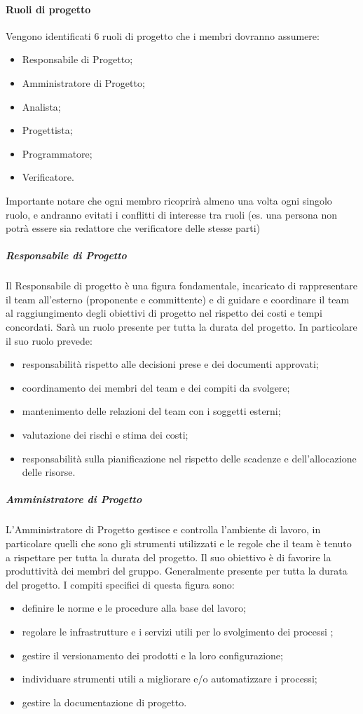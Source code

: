 \paragraph{Ruoli di progetto}
Vengono identificati 6 ruoli di progetto che i membri dovranno assumere:

\begin{itemize}
\item Responsabile di Progetto;
\item Amministratore di Progetto;
\item Analista;
\item Progettista;
\item Programmatore;
\item Verificatore.
\end{itemize}

Importante notare che ogni membro ricoprirà almeno una volta ogni singolo ruolo, e andranno evitati i conflitti di interesse tra ruoli (es. una persona non potrà essere sia redattore che verificatore delle stesse parti)

\subparagraph{Responsabile di Progetto}
Il Responsabile di progetto è una figura fondamentale, incaricato di rappresentare il team all'esterno (proponente e committente)  e di guidare e coordinare il team al raggiungimento degli obiettivi di progetto nel rispetto dei costi e tempi concordati. Sarà un ruolo presente per tutta la durata del progetto.
In particolare il suo ruolo prevede:
\begin{itemize}
\item responsabilità rispetto alle decisioni prese e dei documenti approvati;
\item coordinamento dei membri del team e dei compiti da svolgere;
\item mantenimento delle relazioni del team con i soggetti esterni;
\item valutazione dei rischi e stima dei costi;
\item responsabilità sulla pianificazione nel rispetto delle scadenze e dell'allocazione delle risorse.
\end{itemize}


\subparagraph{Amministratore di Progetto}
L'Amministratore di Progetto gestisce e controlla l'ambiente di lavoro, in particolare quelli che sono gli strumenti utilizzati e le regole che il team è tenuto a rispettare per tutta la durata del progetto. Il suo obiettivo è di favorire la produttività dei membri del gruppo. Generalmente presente per tutta la durata del progetto.
I compiti specifici di questa figura sono:
\begin{itemize}
\item definire le norme e le procedure alla base del lavoro;
\item regolare le infrastrutture e i servizi utili per lo svolgimento dei processi ;
\item gestire il versionamento dei prodotti e la loro configurazione;
\item individuare strumenti utili a migliorare e/o automatizzare i processi;
\item gestire la documentazione di progetto.
\end{itemize}

